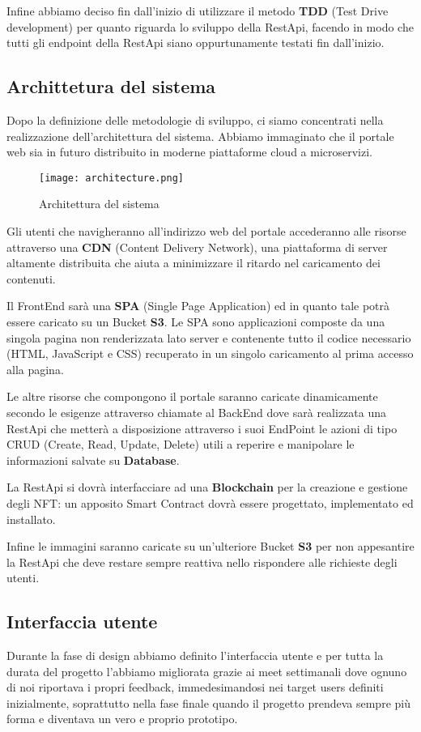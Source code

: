 Infine abbiamo deciso fin dall'inizio di utilizzare il metodo \textbf{TDD} (Test Drive development) per quanto riguarda lo sviluppo della RestApi,
facendo in modo che tutti gli endpoint della RestApi siano oppurtunamente testati fin dall'inizio.

\subsection{Archittetura del sistema}
Dopo la definizione delle metodologie di sviluppo, ci siamo concentrati nella realizzazione dell'architettura del sistema.
Abbiamo immaginato che il portale web sia in futuro distribuito in moderne piattaforme cloud a microservizi.

\begin{figure}[H]
	\centering
	\texttt{[image: architecture.png]}
	\caption{Architettura del sistema}
	\label{fig:architecture}
\end{figure}

Gli utenti che navigheranno all'indirizzo web del portale accederanno alle risorse attraverso una \textbf{CDN} (Content Delivery Network),
una piattaforma di server altamente distribuita che aiuta a minimizzare il ritardo nel caricamento dei contenuti.

Il FrontEnd sarà una \textbf{SPA} (Single Page Application) ed in quanto tale potrà essere caricato su un Bucket \textbf{S3}. 
Le SPA sono applicazioni composte da una singola pagina non renderizzata lato server e
contenente tutto il codice necessario (HTML, JavaScript e CSS) recuperato in un singolo caricamento al prima accesso alla pagina.

Le altre risorse che compongono il portale saranno caricate dinamicamente secondo le esigenze attraverso chiamate al BackEnd dove sarà realizzata una RestApi 
che metterà a disposizione attraverso i suoi EndPoint le azioni di tipo CRUD (Create, Read, Update, Delete) 
utili a reperire e manipolare le informazioni salvate su \textbf{Database}.

La RestApi si dovrà interfacciare ad una \textbf{Blockchain} per la creazione e gestione degli NFT: un apposito Smart Contract dovrà essere progettato, implementato ed installato.

Infine le immagini saranno caricate su un'ulteriore Bucket \textbf{S3} per non appesantire la RestApi 
che deve restare sempre reattiva nello rispondere alle richieste degli utenti.

\subsection{Interfaccia utente}
Durante la fase di design abbiamo definito l'interfaccia utente 
e per tutta la durata del progetto l'abbiamo migliorata grazie ai meet settimanali dove ognuno di noi riportava i propri feedback,
immedesimandosi nei target users definiti inizialmente,
soprattutto nella fase finale quando il progetto prendeva sempre più forma e diventava un vero e proprio prototipo.

